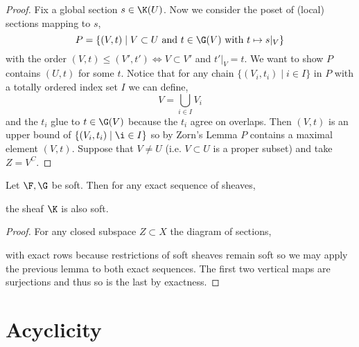 \documentclass[12pt]{article}
\begin{document}
\begin{proof}
Fix a global section $s \in \K(U)$. Now we consider the poset of (local) sections mapping to $s$,
\[ P = \{ (V, t) \mid V \subset U \text{ and } t \in \G(V) \text{ with } t \mapsto s|_V \} \]
with the order $(V, t) \le (V', t') \iff V \subset V'$ and $t'|_V = t$. 
We want to show $P$ contains $(U, t)$ for some $t$. Notice that for any chain $\{ (V_i, t_i) \mid i \in I \}$ in $P$ with a totally ordered index set $I$ we can define,
\[ V = \bigcup_{i \in I} V_i \]
and the $t_i$ glue to $t \in \G(V)$ because the $t_i$ agree on overlaps. Then $(V, t)$ is an upper bound of $\{ (V_i, t_i) \mid \i \in I \}$ so by Zorn's Lemma $P$ contains a maximal element $(V, t)$. Suppose that $V \neq U$ (i.e. $V \subset U$ is a proper subset) and take $Z = V^C$. 
\end{proof}

\begin{lemma}
Let $\F, \G$ be soft. Then for any exact sequence of sheaves,
\begin{center}
\end{center}
the sheaf $\K$ is also soft.
\end{lemma}

\begin{proof}
For any closed subspace $Z \subset X$ the diagram of sections,
\begin{center}
\end{center}
with exact rows because restrictions of soft sheaves remain soft so we may apply the previous lemma to both exact sequences.
The first two vertical maps are surjections and thus so is the last by exactness.
\end{proof}


\section{Acyclicity}

\renewcommand{\C}{\mathcal{C}}
\end{document}
